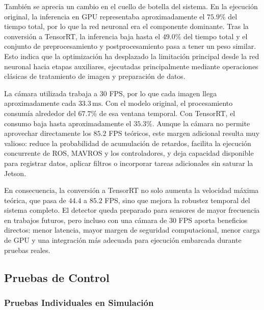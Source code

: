 \vspace{0.3cm}

También se aprecia un cambio en el cuello de botella del sistema. En la ejecución original, la inferencia en GPU representaba aproximadamente el $75.9\%$ del tiempo total, por lo que la red neuronal era el componente dominante. Tras la conversión a TensorRT, la inferencia baja hasta el $49.0\%$ del tiempo total y el conjunto de preprocesamiento y postprocesamiento pasa a tener un peso similar. Esto indica que la optimización ha desplazado la limitación principal desde la red neuronal hacia etapas auxiliares, ejecutadas principalmente mediante operaciones clásicas de tratamiento de imagen y preparación de datos.

\vspace{0.3cm}

La cámara utilizada trabaja a 30 FPS, por lo que cada imagen llega aproximadamente cada $33.3\,\mathrm{ms}$. Con el modelo original, el procesamiento consumía alrededor del $67.7\%$ de esa ventana temporal. Con TensorRT, el consumo baja hasta aproximadamente el $35.3\%$. Aunque la cámara no permite aprovechar directamente los $85.2$ FPS teóricos, este margen adicional resulta muy valioso: reduce la probabilidad de acumulación de retardos, facilita la ejecución concurrente de ROS, MAVROS y los controladores, y deja capacidad disponible para registrar datos, aplicar filtros o incorporar tareas adicionales sin saturar la Jetson.

\vspace{0.3cm}

En consecuencia, la conversión a TensorRT no solo aumenta la velocidad máxima teórica, que pasa de $44.4$ a $85.2$ FPS, sino que mejora la robustez temporal del sistema completo. El detector queda preparado para sensores de mayor frecuencia en trabajos futuros, pero incluso con una cámara de 30 FPS aporta beneficios directos: menor latencia, mayor margen de seguridad computacional, menor carga de GPU y una integración más adecuada para ejecución embarcada durante pruebas reales.

\subsection{Pruebas de Control}

\subsubsection{Pruebas Individuales en Simulación}

